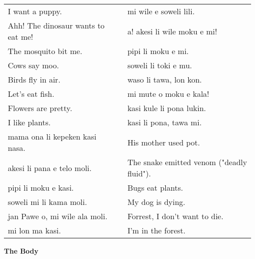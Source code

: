 \begin{supertabular}{p{5,5cm}|ll}
I want a puppy.  && mi wile e soweli lili. \\ %
Ahh! The dinosaur wants to eat me!  && a! akesi li wile moku e mi! \\ %
The mosquito bit me.  && pipi li moku e mi.  \\ %
Cows say moo.  && soweli li toki e mu. \\ %
Birds fly in air.  && waso li tawa, lon kon. \\ %
Let's eat fish.  && mi mute o moku e kala! \\ %
Flowers are pretty.  && kasi kule li pona lukin. \\ %
I like plants.  && kasi li pona, tawa mi. \\
mama ona li kepeken kasi nasa.  && His mother used pot. \\
akesi li pana e telo moli.  && The snake emitted venom ("deadly fluid"). \\
pipi li moku e kasi.  && Bugs eat plants. \\
soweli mi li kama moli.  && My dog is dying. \\
jan Pawe o, mi wile ala moli.  && Forrest, I don't want to die. \\
mi lon ma kasi.  && I'm in the forest. \\
\end{supertabular} 

\textbf{The Body} 
\label{'the_body'}

